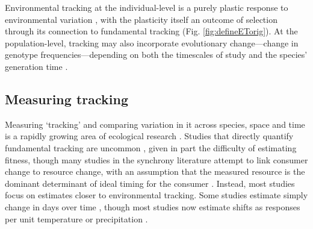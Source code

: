 \documentclass[11pt,letterpaper]{article}
\begin{document}
Environmental tracking at the individual-level is a purely plastic response to environmental variation \citep[in line with current findings on most climate change responses,][]{bonamour2019}, with the plasticity itself an outcome of selection \citep{chevin2010} through its connection to fundamental tracking (Fig. \ref{fig:defineETorig}). At the population-level, tracking may also incorporate evolutionary change---change in genotype frequencies---depending on both the timescales of study and the species' generation time \citep[this evolutionary response can be predicted as the difference between the environmental sensitivity of phenotypic selection and an organism's plasticity, $|B-b|$ in][]{chevin2010}. 
\fi

\subsection{Measuring tracking}
Measuring `tracking' and comparing variation in it across species, space and time is a rapidly growing area of ecological research \citep[e.g.,][]{Cook:2012pnas,fu2015,thackeray2016,cohen2018}. Studies that directly quantify fundamental tracking are uncommon \citep[but see][]{visser2006,charm2008}, given in part the difficulty of estimating fitness, though many studies in the synchrony literature attempt to link consumer change to resource change, with an assumption that the measured resource is the dominant determinant of ideal timing for the consumer \citep[though this may rarely be true, see][]{Singer:2010eb,Johansson2012,reed2013}. Instead, most studies focus on estimates closer to environmental tracking. Some studies estimate simply change in days over time \citep[e.g.,][]{Parmesan:2007tv,kharouba2018}, though most studies now estimate shifts as responses per unit temperature \citep[][]{Richardson:2006qh,Wolkovich:2012n,thackeray2016} or precipitation \citep{inouye2002,Craine:2012kl}. %
\end{document}
